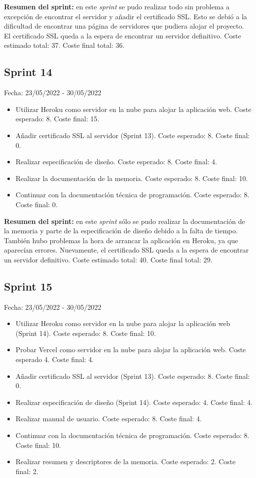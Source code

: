 \textbf{Resumen del sprint:} en este \textit{sprint} se pudo realizar todo sin problema a excepción de encontrar el servidor y añadir el certificado SSL. Esto se debió a la dificultad de encontrar una página de servidores que pudiera alojar el proyecto. El certificado SSL queda a la espera de encontrar un servidor definitivo. Coste estimado total: 37. Coste final total: 36.

\subsection{Sprint 14}
Fecha: 23/05/2022 - 30/05/2022
\begin{itemize}
	\item Utilizar Heroku como servidor en la nube para alojar la aplicación web. Coste esperado: 8. Coste final: 15.
	\item Añadir certificado SSL al servidor (Sprint 13). Coste esperado: 8. Coste final: 0.
	\item Realizar especificación de diseño. Coste esperado: 8. Coste final: 4.
	\item Realizar la documentación de la memoria. Coste esperado: 8. Coste final: 10.
	\item Continuar con la documentación técnica de programación. Coste esperado: 8. Coste final: 0.
\end{itemize}

\textbf{Resumen del sprint:} en este \textit{sprint} sólo se pudo realizar la documentación de la memoria y parte de la especificación de diseño debido a la falta de tiempo. También hubo problemas la hora de arrancar la aplicación en Heroku, ya que aparecían errores. Nuevamente, el certificado SSL queda a la espera de encontrar un servidor definitivo. Coste estimado total: 40. Coste final total: 29.

\subsection{Sprint 15}
Fecha: 23/05/2022 - 30/05/2022
\begin{itemize}
	\item Utilizar Heroku como servidor en la nube para alojar la aplicación web (Sprint 14). Coste esperado: 8. Coste final: 10.
	\item Probar Vercel como servidor en la nube para alojar la aplicación web. Coste esperado 4. Coste final: 4.
	\item Añadir certificado SSL al servidor (Sprint 13). Coste esperado: 8. Coste final: 0.
	\item Realizar especificación de diseño (Sprint 14). Coste esperado: 4. Coste final: 4.
	\item Realizar manual de usuario. Coste esperado: 8. Coste final: 4.
	\item Continuar con la documentación técnica de programación. Coste esperado: 8. Coste final: 10.
	\item Realizar resumen y descriptores de la memoria. Coste esperado: 2. Coste final: 2.
\end{itemize}

